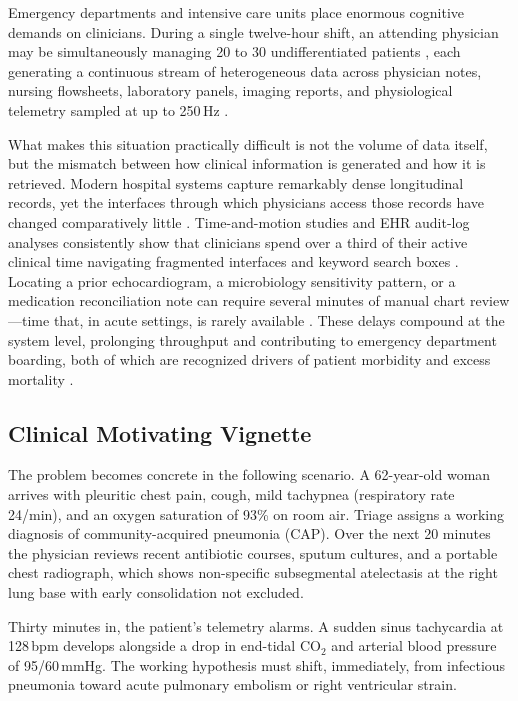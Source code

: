 \documentclass[10pt, onecolumn]{article}
\begin{document}
Emergency departments and intensive care units place enormous cognitive demands on clinicians. During a single twelve-hour shift, an attending physician may be simultaneously managing 20 to 30 undifferentiated patients \cite{topol2019high,miotto2018deep}, each generating a continuous stream of heterogeneous data across physician notes, nursing flowsheets, laboratory panels, imaging reports, and physiological telemetry sampled at up to 250\,Hz \cite{johnson2023mimic,hyland2020hirid}.

What makes this situation practically difficult is not the volume of data itself, but the mismatch between how clinical information is generated and how it is retrieved. Modern hospital systems capture remarkably dense longitudinal records, yet the interfaces through which physicians access those records have changed comparatively little \cite{sutton2020overview,wornow2023shaky}. Time-and-motion studies and EHR audit-log analyses consistently show that clinicians spend over a third of their active clinical time navigating fragmented interfaces and keyword search boxes \cite{sinsky2016allocation,zheng2021analyzing}. Locating a prior echocardiogram, a microbiology sensitivity pattern, or a medication reconciliation note can require several minutes of manual chart review---time that, in acute settings, is rarely available \cite{obermeyer2016predicting,singh2014types}. These delays compound at the system level, prolonging throughput and contributing to emergency department boarding, both of which are recognized drivers of patient morbidity and excess mortality \cite{singer2011crowding,pines2011emergency,singh2014types}.

\subsection{Clinical Motivating Vignette}

The problem becomes concrete in the following scenario. A 62-year-old woman arrives with pleuritic chest pain, cough, mild tachypnea (respiratory rate 24/min), and an oxygen saturation of 93\% on room air. Triage assigns a working diagnosis of community-acquired pneumonia (CAP). Over the next 20 minutes the physician reviews recent antibiotic courses, sputum cultures, and a portable chest radiograph, which shows non-specific subsegmental atelectasis at the right lung base with early consolidation not excluded.

Thirty minutes in, the patient's telemetry alarms. A sudden sinus tachycardia at 128\,bpm develops alongside a drop in end-tidal $\text{CO}_2$ and arterial blood pressure of 95/60\,mmHg. The working hypothesis must shift, immediately, from infectious pneumonia toward acute pulmonary embolism or right ventricular strain.
\end{document}
